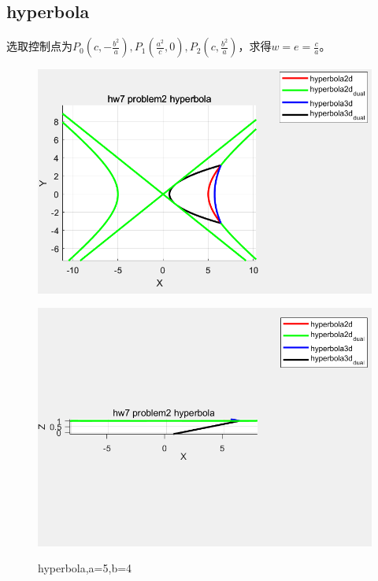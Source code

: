 \documentclass{article}
\begin{document}
	\subsection{hyperbola}
	选取控制点为$P_0(c,-\frac{b^2}{a}),P_1(\frac{a^2}{c},0),P_2(c,\frac{b^2}{a})$，求得$w=e=\frac{c}{a}$。
	\begin{figure}[H]
		\centering
		\begin{minipage}{0.5\linewidth}
			\includegraphics[scale=0.6]{7_2_hyperbola2d}
			\label{fig:72hyperbola2d}
		\end{minipage}
		\hfill
		\begin{minipage}{0.5\linewidth}
			\includegraphics[scale=0.6]{7_2_hyperbola3d}
			\label{fig:72hyperbola3d}
		\end{minipage}
		\caption{hyperbola,a=5,b=4}
		\label{ellipse}
	\end{figure}
\end{document}
